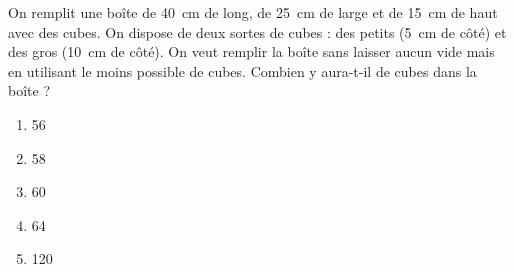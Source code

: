 On remplit une boîte de 40~cm de long, de 25~cm de large et de 15~cm
de haut avec des cubes. On dispose de deux sortes de cubes : des
petits (5~cm de côté) et des gros (10~cm de côté). On veut remplir la
boîte sans laisser aucun vide mais en utilisant le moins possible de
cubes. Combien y aura-t-il de cubes dans la boîte ?
\begin{multicols}{5}
  \begin{enumerate}[A/]
  \item 56
  \item 58
  \item 60
  \item 64
  \item 120
  \end{enumerate}
\end{multicols}